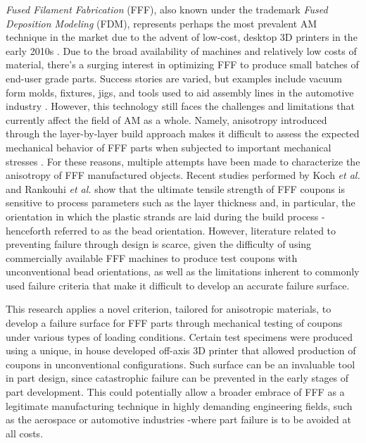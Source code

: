 \documentclass[main.tex]{subfiles}
\begin{document}
\emph{Fused Filament Fabrication} (FFF), also known under the trademark \emph{Fused Deposition Modeling} (FDM\texttrademark), represents perhaps the most prevalent AM technique in the market due to the advent of low-cost, desktop 3D printers in the early 2010s \cite{Capote2017}. Due to the broad availability of machines and relatively low costs of material, there's a surging interest in optimizing FFF to produce small batches of end-user grade parts. Success stories are varied, but examples include vacuum form molds, fixtures, jigs, and tools used to aid assembly lines in the automotive industry \cite{Hartman2014, VanHulle2017,deVries2017}. However, this technology still faces the challenges and limitations that currently affect the field of AM as a whole. Namely, anisotropy introduced through the layer-by-layer build approach makes it difficult to assess the expected mechanical behavior of FFF parts when subjected to important mechanical stresses \cite{Capote2017}. For these reasons, multiple attempts have been made to characterize the anisotropy of FFF manufactured objects. Recent studies performed by Koch \emph{et al.} \cite{Koch2017} and Rankouhi \emph{et al.} \cite{Rankouhi2016} show that the ultimate tensile strength of FFF coupons is sensitive to process parameters such as the layer thickness and, in particular, the orientation in which the plastic strands are laid during the build process -henceforth referred to as the bead orientation. However, literature related to preventing failure through design is scarce, given the difficulty of using commercially available FFF machines to produce test coupons with unconventional bead orientations, as well as the limitations inherent to commonly used failure criteria that make it difficult to develop an accurate failure surface.

This research applies a novel criterion, tailored for anisotropic materials, to develop a failure surface for FFF parts through mechanical testing of coupons under various types of loading conditions. Certain test specimens were produced using a unique, in house developed off-axis 3D printer that allowed production of coupons in unconventional configurations. Such surface can be an invaluable tool in part design, since catastrophic failure can be prevented in the early stages of part development. This could potentially allow a broader embrace of FFF as a legitimate manufacturing technique in highly demanding engineering fields, such as the aerospace or automotive industries -where part failure is to be avoided at all costs.
\end{document}

